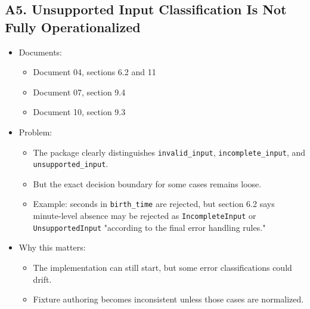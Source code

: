 \documentclass[11pt]{article}
\begin{document}
\subsection{A5. Unsupported Input Classification Is Not Fully Operationalized}
\label{sec:org80db8bc}
\begin{itemize}
\item Documents:
\begin{itemize}
\item Document 04, sections 6.2 and 11
\item Document 07, section 9.4
\item Document 10, section 9.3
\end{itemize}
\item Problem:
\begin{itemize}
\item The package clearly distinguishes \texttt{invalid\_input}, \texttt{incomplete\_input}, and \texttt{unsupported\_input}.
\item But the exact decision boundary for some cases remains loose.
\item Example: seconds in \texttt{birth\_time} are rejected, but section 6.2 says minute-level absence may be rejected as \texttt{IncompleteInput} or \texttt{UnsupportedInput} "according to the final error handling rules."
\end{itemize}
\item Why this matters:
\begin{itemize}
\item The implementation can still start, but some error classifications could drift.
\item Fixture authoring becomes inconsistent unless those cases are normalized.
\end{itemize}
\end{itemize}
\end{document}
